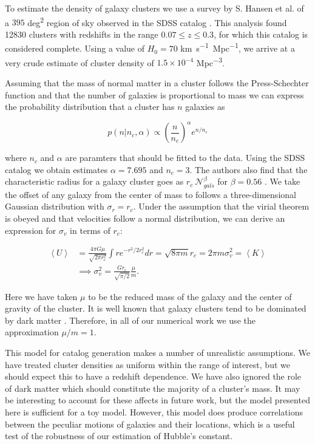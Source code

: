 To estimate the density of galaxy clusters we use a survey by S. Hansen et al. of a $395$ \si{deg^2} region of sky observed in the SDSS catalog \cite{Hansen_2005}. This analysis found 12830 clusters with redshifts in the range $0.07\leq z\leq 0.3$, for which this catalog is considered complete. Using a value of $H_0=70$ \si{km.s^{-1}.Mpc^{-1}}, we arrive at a very crude estimate of cluster density of $1.5\times 10^{-4}$ \si{Mpc^{-3}}.

Assuming that the mass of normal matter in a cluster follows the Press-Schechter function \cite{Press_1974} and that the number of galaxies is proportional to mass we can express the probability distribution that a cluster has $n$ galaxies as

\begin{equation}
p(n | n_c, \alpha) \propto \left( \frac{n}{n_c} \right)^{\alpha}e^{n/n_c}
\end{equation}

where $n_c$ and $\alpha$ are paramters that should be fitted to the data. Using the SDSS catalog we obtain estimates $\alpha = 7.695$ and $n_c = 3$. The authors also find that the characteristic radius for a galaxy cluster goes as $r_c ~ \mathcal{N}_{gals}^\beta$ for $\beta=0.56$ \cite{Hansen_2005}. We take the offset of any galaxy from the center of mass to follows a three-dimensional Gaussian distribution with $\sigma_r = r_c$. Under the assumption that the virial theorem is obeyed and that velocities follow a normal distribution, we can derive an expression for $\sigma_v$ in terms of $r_c$:

\begin{widetext}
\begin{align}
    \left<U\right> &= \frac{4\pi G\mu}{\sqrt{2\pi r_c^2}} \int r e^{ -r^2 / 2r_c^2} dr = \sqrt{8\pi m}r_c = 2\pi m\sigma_v^2 = \left<K\right> \nonumber\\
    &\implies \sigma_v^2 = \frac{G r_c}{\sqrt{\pi/2}}\frac{\mu}{m}.
\end{align}
\end{widetext}
Here we have taken $\mu$ to be the reduced mass of the galaxy and the center of gravity of the cluster. It is well known that galaxy clusters tend to be dominated by dark matter \cite{Clowe_2006, Hoh_2020}. Therefore, in all of our numerical work we use the approximation $\mu / m = 1$.

This model for catalog generation makes a number of unrealistic assumptions. We have treated cluster densities as uniform within the range of interest, but we should expect this to have a redshift dependence. We have also ignored the role of dark matter which should constitute the majority of a cluster's mass. It may be interesting to account for these affects in future work, but the model presented here is sufficient for a toy model. However, this model does produce correlations between the peculiar motions of galaxies and their locations, which is a useful test of the robustness of our estimation of Hubble's constant.


